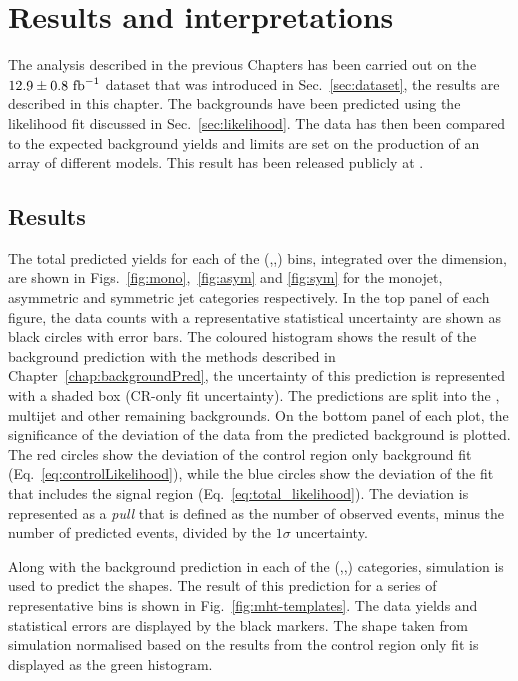 \chapter{Results and interpretations}
\label{chap:results}

The analysis described in the previous Chapters has been carried out
on the $12.9\pm0.8~\text{fb}^{-1}$ dataset that was introduced in
Sec.~\ref{sec:dataset}, the results are described in this chapter. The
\SM backgrounds have been predicted using the likelihood fit discussed
in Sec.~\ref{sec:likelihood}. The data has then been compared to the expected
background yields and limits are set on the production of an array of
different \SUSY models. This result has been released publicly
at \cite{CMS-PAS-SUS-16-016}.

\section{Results}

The total predicted \SM yields for each of the (\HT,\nj,\nb) bins,
integrated over the \MHT dimension, are shown in
Figs.~\ref{fig:mono},~\ref{fig:asym} and \ref{fig:sym} for the
monojet, asymmetric and symmetric jet categories respectively. In the
top panel of each figure, the data counts with a representative
statistical uncertainty are shown as black circles with error bars.
The coloured histogram shows the result of the \SM background
prediction with the \TF methods described in
Chapter~\ref{chap:backgroundPred}, the uncertainty of this prediction
is represented with a shaded box (CR-only fit uncertainty). The
predictions are split into the \znunu, \QCD multijet and other
remaining \SM backgrounds. On the bottom panel of each plot, the
significance of the deviation of the data from the predicted \SM
background is plotted. The red circles show the deviation of the
control region only background fit (Eq.~\ref{eq:controlLikelihood}),
while the blue circles show the deviation of the fit that includes the
signal region (Eq.~\ref{eq:total_likelihood}). The deviation is
represented as a \emph{pull} that is defined as the number of observed
events, minus the number of predicted events, divided by the $1\sigma$
uncertainty.

Along with the background prediction in each of the (\HT,\nj,\nb)
categories, simulation is used to predict the \MHT shapes. The result
of this prediction for a series of representative bins is shown in
Fig.~\ref{fig:mht-templates}. The data yields and statistical errors
are displayed by the black markers. The \MHT shape taken from
simulation normalised based on the results from the control region
only fit is displayed as the green histogram.


